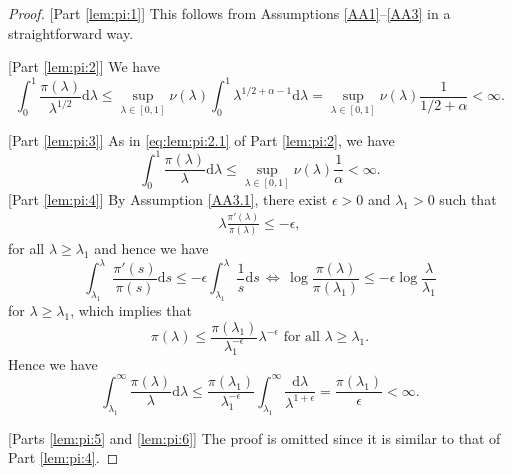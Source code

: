 \documentclass[preprint,11pt]{imsart}
\numberwithin{equation}{section}
\theoremstyle{plain}
\theoremstyle{definition}
\theoremstyle{remark}
\newcommand{\rd}{\mathrm{d}}
\begin{document}
 \begin{proof}\mbox{}
[Part \ref{lem:pi:1}] This follows from Assumptions \ref{AA1}--\ref{AA3}
  in a straightforward way.
  
[Part \ref{lem:pi:2}] We have
\begin{equation}\label{eq:lem:pi:2.1}
\int_0^1\frac{\pi(\lambda)}{\lambda^{1/2}}\rd \lambda\leq
 \sup_{\lambda\in[0,1]}\nu(\lambda)\int_0^1\lambda^{1/2+\alpha-1}\rd \lambda
 =\sup_{\lambda\in[0,1]}\nu(\lambda)\frac{1}{1/2+\alpha}<\infty.
\end{equation}

  [Part \ref{lem:pi:3}] 
  As in \eqref{eq:lem:pi:2.1} of Part \ref{lem:pi:2}, we have
 \begin{equation*}
  \int_0^1\frac{\pi(\lambda)}{\lambda}\rd \lambda\leq\sup_{\lambda\in[0,1]}\nu(\lambda)\frac{1}{\alpha}<\infty.
 \end{equation*}
[Part \ref{lem:pi:4}]
 By Assumption \ref{AA3.1}, there exist $\epsilon>0$ and $ \lambda_1>0$ such that
\begin{align*}
 \lambda\frac{\pi'(\lambda)}{\pi(\lambda)}\leq -\epsilon,
\end{align*}
for all $\lambda\geq \lambda_1$ and hence
we have
\begin{equation}\label{eq:korene.0}
 \int_{\lambda_1}^\lambda \frac{\pi'(s)}{\pi(s)}\rd s \leq -\epsilon \int_{\lambda_1}^\lambda \frac{1}{s}\rd s
\, \Leftrightarrow \,
  \log \frac{\pi(\lambda)}{\pi(\lambda_1)}
 \leq  -\epsilon\log\frac{\lambda}{\lambda_1}
\end{equation}
for $\lambda\geq \lambda_1$, which implies that
\begin{equation}\label{eq:korene}
 \pi(\lambda)\leq \frac{\pi(\lambda_1)}{\lambda_1^{-\epsilon}}\lambda^{-\epsilon}\text{ for all }\lambda\geq \lambda_1.
\end{equation}
Hence we have
\begin{equation}\label{show.proper.0}
 \int_{\lambda_1}^\infty\frac{\pi(\lambda)}{\lambda}\rd \lambda
\leq \frac{\pi(\lambda_1)}{\lambda_1^{-\epsilon}}\int_{\lambda_1}^\infty \frac{\rd\lambda }{\lambda^{1+\epsilon}}
= \frac{\pi(\lambda_1)}{\epsilon}<\infty.
\end{equation}

[Parts \ref{lem:pi:5} and \ref{lem:pi:6}] 
The proof is omitted since it is similar to that of Part \ref{lem:pi:4}.


\end{proof}
\end{document}
